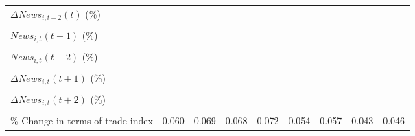 {\begin{tabular}{l*{8}{c}}
\addlinespace
$ \Delta News_{i,t-2}(t)$ (\%)&                     &                     &                     &                     &                     &                     &                     &                     \\
                    &                     &                     &                     &                     &                     &                     &                     &                     \\
\addlinespace
$ News_{i,t}(t+1)$ (\%)&                     &                     &                     &                     &                     &                     &                     &                     \\
                    &                     &                     &                     &                     &                     &                     &                     &                     \\
\addlinespace
$ News_{i,t}(t+2)$ (\%)&                     &                     &                     &                     &                     &                     &                     &                     \\
                    &                     &                     &                     &                     &                     &                     &                     &                     \\
\addlinespace
$ \Delta News_{i,t}(t+1)$ (\%)&                     &                     &                     &                     &                     &                     &                     &                     \\
                    &                     &                     &                     &                     &                     &                     &                     &                     \\
\addlinespace
$ \Delta News_{i,t}(t+2)$ (\%)&                     &                     &                     &                     &                     &                     &                     &                     \\
                    &                     &                     &                     &                     &                     &                     &                     &                     \\
\addlinespace
\% Change in terms-of-trade index&       0.060\sym{*}  &       0.069\sym{**} &       0.068\sym{**} &       0.072\sym{**} &       0.054\sym{*}  &       0.057\sym{*}  &       0.043\sym{**} &       0.046\sym{*}  \\

\end{tabular}}

